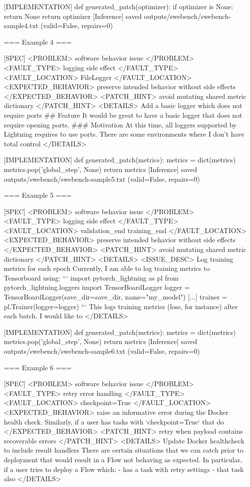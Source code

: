 [IMPLEMENTATION]
def generated_patch(optimizer):
if optimizer is None:
return None
return optimizer
[Inference] saved outputs/swebench/swebench-sample4.txt (valid=False, repairs=0)

=== Example 4 ===

[SPEC]
<PROBLEM> software behavior issue </PROBLEM> <FAULT_TYPE> logging side effect </FAULT_TYPE> <FAULT_LOCATION> FileLogger </FAULT_LOCATION> <EXPECTED_BEHAVIOR> preserve intended behavior without side effects </EXPECTED_BEHAVIOR> <PATCH_HINT> avoid mutating shared metric dictionary </PATCH_HINT> <DETAILS> Add a basic logger which does not require ports ## Feature It would be great to have a basic logger that does not require opening ports. ### Motivation At this time, all loggers supported by Lightning requires to use ports. There are some environments where I don't have total control </DETAILS>

[IMPLEMENTATION]
def generated_patch(metrics):
metrics = dict(metrics)
metrics.pop('global_step', None)
return metrics
[Inference] saved outputs/swebench/swebench-sample5.txt (valid=False, repairs=0)

=== Example 5 ===

[SPEC]
<PROBLEM> software behavior issue </PROBLEM> <FAULT_TYPE> logging side effect </FAULT_TYPE> <FAULT_LOCATION> validation_end training_end </FAULT_LOCATION> <EXPECTED_BEHAVIOR> preserve intended behavior without side effects </EXPECTED_BEHAVIOR> <PATCH_HINT> avoid mutating shared metric dictionary </PATCH_HINT> <DETAILS> <ISSUE_DESC> Log training metrics for each epoch Currently, I am able to log training metrics to Tensorboard using: ``` import pytorch_lightning as pl from pytorch_lightning.loggers import TensorBoardLogger logger = TensorBoardLogger(save_dir=save_dir, name="my_model") [...] trainer = pl.Trainer(logger=logger) ``` This logs training metrics (loss, for instance) after each batch. I would like to </DETAILS>

[IMPLEMENTATION]
def generated_patch(metrics):
metrics = dict(metrics)
metrics.pop('global_step', None)
return metrics
[Inference] saved outputs/swebench/swebench-sample6.txt (valid=False, repairs=0)

=== Example 6 ===

[SPEC]
<PROBLEM> software behavior issue </PROBLEM> <FAULT_TYPE> retry error handling </FAULT_TYPE> <FAULT_LOCATION> checkpoint=True </FAULT_LOCATION> <EXPECTED_BEHAVIOR> raise an informative error during the Docker health check. Similarly, if a user has tasks with `checkpoint=True` that do </EXPECTED_BEHAVIOR> <PATCH_HINT> retry when payload contains recoverable errors </PATCH_HINT> <DETAILS> Update Docker healthcheck to include result handlers There are certain situations that we can catch prior to deployment that would result in a Flow not behaving as expected. In particular, if a user tries to deploy a Flow which: - has a task with retry settings - that task also </DETAILS>

